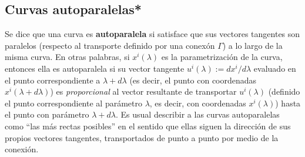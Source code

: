 \subsection{Curvas autoparalelas*}
Se dice que una curva es \textbf{autoparalela} si satisface que sus vectores tangentes son paralelos (respecto al transporte definido por una conexón $\Gamma$) a lo largo de la misma curva. En otras palabras, si $x^i(\lambda)$ es la parametrización de la curva, entonces ella es autoparalela si su vector tangente $u^i(\lambda):=dx^i/d\lambda$ evaluado en el punto correspondiente a $\lambda+d\lambda$ (es decir, el punto con coordenadas $x^i(\lambda+d\lambda)$) es \textit{proporcional} al vector resultante de transportar $u^i(\lambda)$ (definido el punto correspondiente al parámetro $\lambda$, es decir, con coordenadas $x^i(\lambda)$) hasta el punto con parámetro $\lambda+d\lambda$. Es usual describir a las curvas autoparalelas como ``las más rectas posibles'' en el sentido que ellas siguen la dirección de sus propios vectores tangentes, transportados de punto a punto por medio de la conexión.


